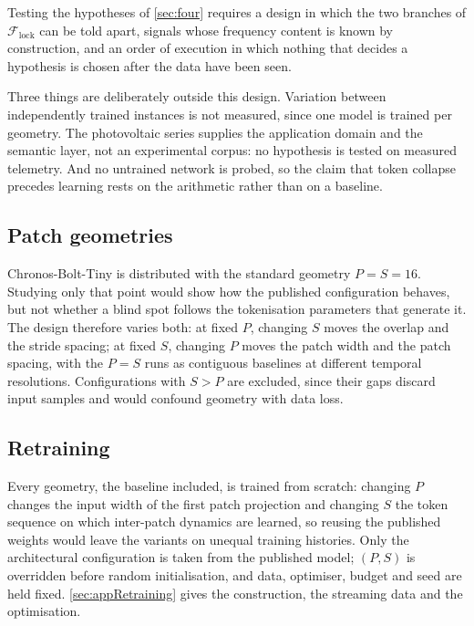Testing the hypotheses of \autoref{sec:four} requires a design in which the two branches of $\mathcal F_{\mathrm{lock}}$ can be told apart, signals whose frequency content is known by construction, and an order of execution in which nothing that decides a hypothesis is chosen after the data have been seen.

Three things are deliberately outside this design. Variation between independently trained instances is not measured, since one model is trained per geometry. The photovoltaic series supplies the application domain and the semantic layer, not an experimental corpus: no hypothesis is tested on measured telemetry. And no untrained network is probed, so the claim that token collapse precedes learning rests on the arithmetic rather than on a baseline.

\subsection{Patch geometries}

Chronos-Bolt-Tiny is distributed with the standard geometry $P=S=16$. Studying only that point would show how the published configuration behaves, but not whether a blind spot follows the tokenisation parameters that generate it. The design therefore varies both: at fixed $P$, changing $S$ moves the overlap and the stride spacing; at fixed $S$, changing $P$ moves the patch width and the patch spacing, with the $P=S$ runs as contiguous baselines at different temporal resolutions. Configurations with $S>P$ are excluded, since their gaps discard input samples and would confound geometry with data loss.

\subsection{Retraining}

Every geometry, the baseline included, is trained from scratch: changing $P$ changes the input width of the first patch projection and changing $S$ the token sequence on which inter-patch dynamics are learned, so reusing the published weights would leave the variants on unequal training histories. Only the architectural configuration is taken from the published model; $(P,S)$ is overridden before random initialisation, and data, optimiser, budget and seed are held fixed. \autoref{sec:appRetraining} gives the construction, the streaming data and the optimisation.



